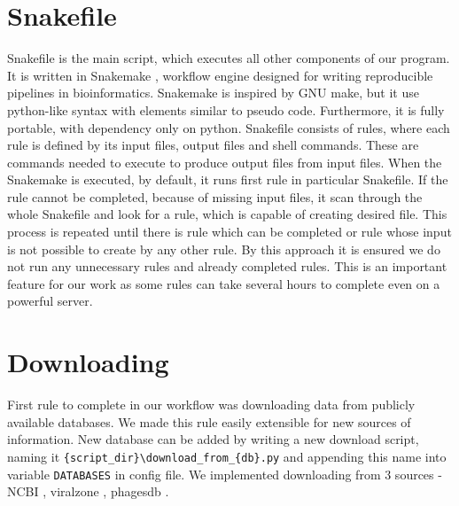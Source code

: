 \section{Snakefile}
Snakefile is the main script, which executes all other components of our program. 
It is written in Snakemake \cite{snakemake}, workflow engine designed for writing reproducible pipelines in bioinformatics. 
Snakemake is inspired by GNU make, but it use python-like syntax with elements similar to pseudo code.
Furthermore, it is fully portable, with dependency only on python.
Snakefile consists of rules, where each rule is defined by its input files, output files and shell commands.
These are commands needed to execute to produce output files from input files.
When the Snakemake is executed, by default, it runs first rule in particular Snakefile. 
If the rule cannot be completed, because of missing input files, it scan through the whole Snakefile and look for a rule, which is capable of creating desired file. 
This process is repeated until there is rule which can be completed or rule whose input is not possible to create by any other rule.
By this approach it is ensured we do not run any unnecessary rules and already completed rules.
This is an important feature for our work as some rules can take several hours to complete even on a powerful server. 

\section{Downloading}
First rule to complete in our workflow was downloading data from publicly available databases.
We made this rule easily extensible for new sources of information.
New database can be added by writing a new download script, 
naming it \verb|{script_dir}\download_from_{db}.py| and appending this name into variable \verb|DATABASES| in config file. We implemented downloading from 3 sources - NCBI \cite{ncbi}, viralzone \cite{viralzone}, phagesdb  \cite{phagesdb}.

